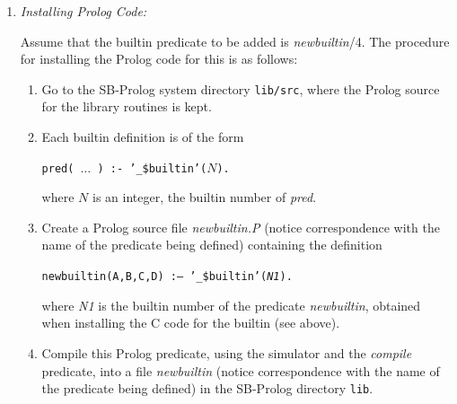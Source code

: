 \begin{enumerate}
\begin{enumerate}
\item
Execute the updated make file to create an updated object file {\em builtin}.

\item Go to the directory {\tt sim} and execute {\em make} to install
the new file {\tt builtin}.
\end{enumerate}

\item {\em Installing Prolog Code:}

Assume that the builtin predicate to be added is {\em newbuiltin}/4.
The procedure for installing the Prolog code for this is as follows:
\begin{enumerate}
\item
Go to the SB-Prolog system directory {\tt lib/src},
where the Prolog source for the library routines is kept.
\item Each builtin definition is of the form
\begin{center}
{\tt pred( $\ldots$ ) :- '\_\$builtin'($N$).}
\end{center}
where $N$ is an integer, the builtin number of {\em pred}.
\item
Create a Prolog source file {\em newbuiltin.P} (notice correspondence with
the name of the predicate being defined) containing the definition
\begin{center}
{\tt newbuiltin(A,B,C,D) :-- '\_\$builtin'({\em N1}).}
\end{center}
where {\em N1} is the builtin number of the predicate {\em newbuiltin},
obtained when installing the C code for the builtin (see above).
\item
Compile this Prolog predicate, using the simulator and the {\em compile}
predicate, into a file {\em newbuiltin}
(notice correspondence with the name of the predicate being defined)
in the SB-Prolog directory {\tt lib}.
\end{enumerate}
\end{enumerate}

